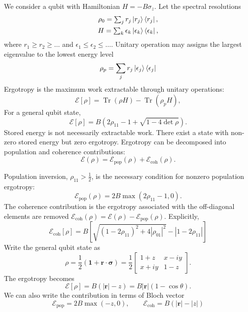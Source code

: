 \documentclass[../../../main.tex]{subfiles}
\begin{document}
We consider a qubit with Hamiltonian $H=-B\sigma_z$.
Let the spectral resolutions
\begin{gather*}
      \rho_0 =\textstyle \sum_{j} r_j \ket{ r_j}\bra{ r_j}, \\
H = \textstyle\sum_{k} \epsilon_k \ket{\epsilon_k}\bra{\epsilon_k},
\end{gather*}
where $  r_1 \geq r_2 \geq \ldots$ and $ \epsilon_1 \leq \epsilon_2 \leq \ldots$.
Unitary operation may assigns the largest eigenvalue to the
lowest energy level
\begin{equation*}
\rho_p = \sum_{j}r_j \ket{\epsilon_j} \bra{\epsilon_j}
\end{equation*}
  Ergotropy is the maximum work extractable through unitary operations:
\[
  \mathcal E[\rho]=\operatorname{Tr}(\rho H)
  -\operatorname{Tr}(\rho_p H),
\]
For a general qubit state,
\begin{equation*}
  \mathcal E[\rho]
  =B\left(2\rho_{11}-1+
  \sqrt{1-4\det\rho}\right).
\end{equation*}
Stored energy is not necessarily extractable work.
There exist a state with non-zero stored energy but zero ergotropy. 
Ergotropy can be decomposed into population and
coherence contributions:
      \[
        \mathcal E(\rho)
        =\mathcal E_{\mathrm{pop}}(\rho)
        +\mathcal E_{\mathrm{coh}}(\rho).
      \]

Population inversion, \(\rho_{11}>\frac12\), is the
necessary condition for nonzero population
ergotropy:
\[
  \mathcal E_{\mathrm{pop}}(\rho)
  =2B\max(2\rho_{11}-1,0).
\]
The coherence contribution is the ergotropy associated with the off-diagonal elements are removed $        \mathcal E_{\mathrm{coh}}(\rho)
  =\mathcal E(\rho)-\mathcal E_{\mathrm{pop}}(\rho).$
Explicitly,
\begin{equation*}
  \mathcal E_{\mathrm{coh}}[\rho]
=B\left[\sqrt{(1-2\rho_{11})^2+4|\rho_{01}|^2}-|1-2\rho_{11}|\right]
\end{equation*}
Write the general qubit state as
\[
  \rho=\frac12(\mathbf 1+\mathbf r\cdot\boldsymbol\sigma)
  =\frac12
  \begin{bmatrix}
    1+z & x-iy\\
    x+iy & 1-z
  \end{bmatrix}.
\]
The ergotropy becomes
\[
\mathcal E[\rho]=B(|\mathbf r|-z)=        B|\mathbf r|(1-\cos\theta).
\]
We can also write the contribution in terms of Bloch vector
\begin{equation*}
\mathcal E_{\mathrm{pop}}=2B\max(-z,0),\qquad
\mathcal E_{\mathrm{coh}}=B\left(|\mathbf r|-|z|\right)
\end{equation*}
\end{document}
